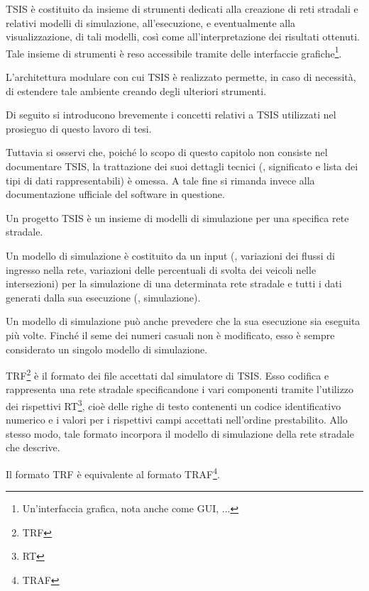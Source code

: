 \acs{TSIS} è costituito da insieme di strumenti dedicati alla creazione di reti stradali e relativi modelli di simulazione, all'esecuzione, e eventualmente alla visualizzazione, di tali modelli, così come all'interpretazione dei risultati ottenuti. Tale insieme di strumenti è reso accessibile tramite delle interfaccie grafiche\footnote{Un'interfaccia grafica, nota anche come \acf{GUI}, ...}.

L'architettura modulare con cui \acs{TSIS} è realizzato permette, in caso di necessità, di estendere tale ambiente creando degli ulteriori strumenti.

Di seguito si introducono brevemente i concetti relativi a \acs{TSIS} utilizzati nel prosieguo di questo lavoro di tesi.

Tuttavia si osservi che, poiché lo scopo di questo capitolo non consiste nel documentare \acs{TSIS}, la trattazione dei suoi dettagli tecnici (\eg{}, significato e lista dei tipi di dati rappresentabili) è omessa. A tale fine si rimanda invece alla documentazione ufficiale del software in questione.

\begin{definizione}\label{defn:tsis-proj}
Un progetto \acs{TSIS} è un insieme di modelli di simulazione per una specifica rete stradale.
\end{definizione}

\begin{definizione}\label{defn:tsis-sim-model}
Un modello di simulazione è costituito da un input (\eg{}, variazioni dei flussi di ingresso nella rete, variazioni delle percentuali di svolta dei veicoli nelle intersezioni) per la simulazione di una determinata rete stradale e tutti i dati generati dalla sua esecuzione (\ie{}, simulazione).
\end{definizione}
\begin{osservazione}
Un modello di simulazione può anche prevedere che la sua esecuzione sia eseguita più volte. Finché il seme dei numeri casuali non è modificato, esso è sempre considerato un singolo modello di simulazione.
\end{osservazione}

\begin{definizione}\label{defn:trf-format}
\acs{TRF}\footnote{\acf{TRF}} è il formato dei file accettati dal simulatore di \acs{TSIS}. Esso codifica e rappresenta una rete stradale specificandone i vari componenti tramite l'utilizzo dei rispettivi \acs{RT}\footnote{\acf{RT}}, cioè delle righe di testo contenenti un codice identificativo numerico e i valori per i rispettivi campi accettati nell'ordine prestabilito. Allo stesso modo, tale formato incorpora il modello di simulazione della rete stradale che descrive.
\end{definizione}
\begin{osservazione}
Il formato \acs{TRF} è equivalente al formato \acs{TRAF}\footnote{\acf{TRAF}}.
\end{osservazione}

